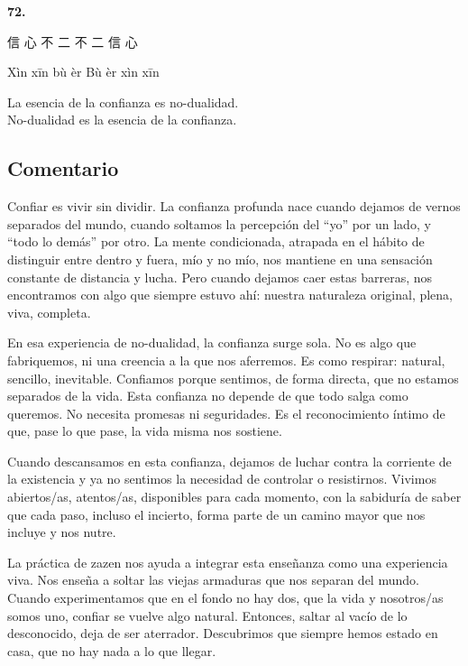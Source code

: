 \documentclass[
  a5paperpaper,
]{article}
\begin{document}
\hfill\break

\hypertarget{02}{}
\begin{verseblock}

\newpage

\begin{center}\textbf{72.}\end{center}

信 心 不 二 不 二 信 心

Xìn xīn bù èr Bù èr xìn xīn

La esencia de la confianza es no-dualidad.\\
No-dualidad es la esencia de la confianza.

\end{verseblock}

\hfill\break

\hypertarget{comentario-71}{%
\subsection{Comentario}\label{comentario-71}}

Confiar es vivir sin dividir. La confianza profunda nace cuando dejamos
de vernos separados del mundo, cuando soltamos la percepción del ``yo''
por un lado, y ``todo lo demás'' por otro. La mente condicionada,
atrapada en el hábito de distinguir entre dentro y fuera, mío y no mío,
nos mantiene en una sensación constante de distancia y lucha. Pero
cuando dejamos caer estas barreras, nos encontramos con algo que siempre
estuvo ahí: nuestra naturaleza original, plena, viva, completa.

En esa experiencia de no-dualidad, la confianza surge sola. No es algo
que fabriquemos, ni una creencia a la que nos aferremos. Es como
respirar: natural, sencillo, inevitable. Confiamos porque sentimos, de
forma directa, que no estamos separados de la vida. Esta confianza no
depende de que todo salga como queremos. No necesita promesas ni
seguridades. Es el reconocimiento íntimo de que, pase lo que pase, la
vida misma nos sostiene.

Cuando descansamos en esta confianza, dejamos de luchar contra la
corriente de la existencia y ya no sentimos la necesidad de controlar o
resistirnos. Vivimos abiertos/as, atentos/as, disponibles para cada
momento, con la sabiduría de saber que cada paso, incluso el incierto,
forma parte de un camino mayor que nos incluye y nos nutre.

La práctica de zazen nos ayuda a integrar esta enseñanza como una
experiencia viva. Nos enseña a soltar las viejas armaduras que nos
separan del mundo. Cuando experimentamos que en el fondo no hay dos, que
la vida y nosotros/as somos uno, confiar se vuelve algo natural.
Entonces, saltar al vacío de lo desconocido, deja de ser aterrador.
Descubrimos que siempre hemos estado en casa, que no hay nada a lo que
llegar.
\end{document}
